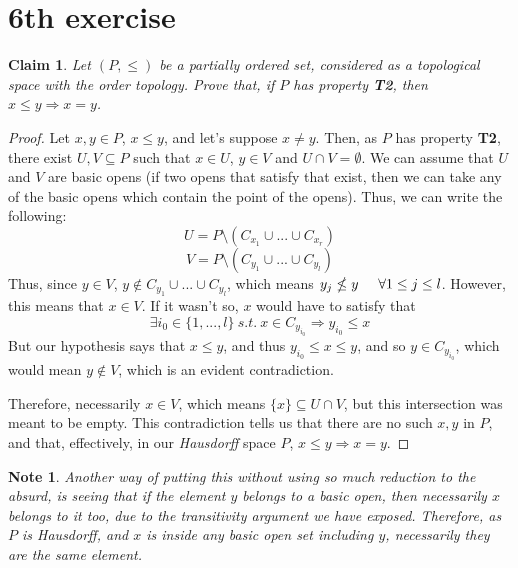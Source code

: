 \documentclass[10pt,a4paper]{article}
\newtheorem*{lemma}{Claim}
\newtheorem*{note}{Note}
\begin{document}
\section*{6th exercise}
\begin{lemma}
Let $(P,\leq )$ be a partially ordered set, considered as a topological space with the order topology. Prove that, if $P$ has property \textbf{T2}, then $x\leq y\Rightarrow x=y$.
\end{lemma}
\begin{proof}
Let $x,y\in P$, $x\leq y$, and let's suppose $x\neq y$. Then, as $P$ has property \textbf{T2}, there exist $U,V\subseteq P$ such that $x\in U$, $y\in V$ and $U\cap V=\emptyset$. We can assume that $U$ and $V$ are basic opens (if two opens that satisfy that exist, then we can take any of the basic opens which contain the point of the opens). Thus, we can write the following:
\[U=P \setminus (C_{x_1}\cup ...\cup C_{x_r})\]
\[V=P \setminus (C_{y_1}\cup ...\cup C_{y_l})\]
Thus, since $y\in V$, $y\notin C_{y_1}\cup ...\cup C_{y_l}$, which means $y_j\nleq y \hspace{5mm}\forall 1\leq j\leq l$.
However, this means that $x\in V$. If it wasn't so, $x$ would have to satisfy that
\[\exists i_0 \in \{ 1,...,l \}\: s.t. \: x\in C_{y_{i_0}} \Rightarrow y_{i_0}\leq x\]
But our hypothesis says that $x\leq y$, and thus $y_{i_0}\leq x\leq y$, and so $y\in C_{y_{i_0}}$, which would mean $y\notin V$, which is an evident contradiction.

Therefore, necessarily $x\in V$, which means $\{ x\} \subseteq U\cap V$, but this intersection was meant to be empty. This contradiction tells us that there are no such $x,y$ in $P$, and that, effectively, in our \textit{Hausdorff} space $P$, $x\leq y \Rightarrow x=y$.
\end{proof}

\begin{note}
Another way of putting this without using so much reduction to the absurd, is seeing that if the element $y$ belongs to a basic open, then necessarily $x$ belongs to it too, due to the transitivity argument we have exposed. Therefore, as $P$ is \textit{Hausdorff}, and $x$ is inside any basic open set including $y$, necessarily they are the same element.
\end{note}
\end{document}

